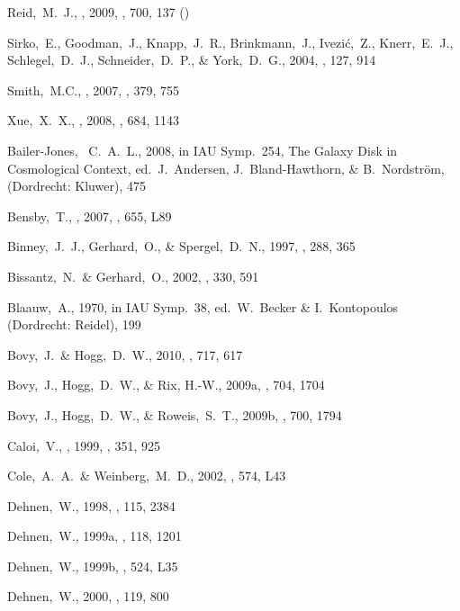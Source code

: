 \begin{thebibliography}{99}
 Reid,~M.~J., \etal, 2009,
  \apj, 700, 137 (\reid)

 Sirko,~E., Goodman,~J., Knapp,~J.~R., Brinkmann,~J., Ivezi\'{c},~Z., Knerr,~E.~J., Schlegel,~D.~J., Schneider,~D.~P., \& York,~D.~G., 2004,
  \aj, 127, 914

 Smith,~M.C., \etal, 2007,
  \mnras, 379, 755

 Xue,~X.~X., \etal, 2008, 
  \apj, 684, 1143



  Bailer-Jones, ~C.~A.~L., 2008,
  in IAU Symp.~254, The Galaxy Disk in Cosmological Context, ed.~J.~Andersen, J.~Bland-Hawthorn, \& B.~Nordstr\"{o}m, (Dordrecht: Kluwer), 475  

  Bensby,~T., \etal, 2007,
  \apjl, 655, L89

  Binney,~J.~J., Gerhard,~O., \& Spergel,~D.~N., 1997,
  \mnras, 288, 365

  Bissantz,~N.~\& Gerhard,~O., 2002,
  \mnras, 330, 591

  Blaauw,~A., 1970, in IAU Symp.~38, ed.~W.~Becker \& I.~Kontopoulos (Dordrecht: Reidel), 199

 Bovy,~J.~\& Hogg,~D.~W., 2010,
  \apj, 717, 617

  Bovy,~J., Hogg,~D.~W., \& Rix, H.-W., 2009a,
  \apj, 704, 1704

 Bovy,~J., Hogg,~D.~W., \& Roweis,~S.~T., 2009b,
  \apj, 700, 1794

  Caloi,~V., \etal, 1999,
  \aap, 351, 925

  Cole,~A.~A.~\& Weinberg,~M.~D., 2002,
  \apjl, 574, L43

Dehnen,~W., 1998, \aj, 115, 2384

  Dehnen,~W., 1999a, \aj, 118, 1201

  Dehnen,~W., 1999b, \apj, 524, L35

  Dehnen,~W., 2000, \aj, 119, 800


\end{thebibliography}
